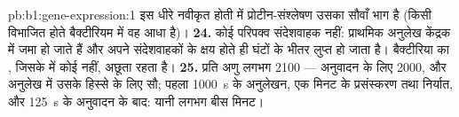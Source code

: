 \begin{solution}{pb:b1:gene-expression:1}
इस धीरे नवीकृत होती  में प्रोटीन-संश्लेषण उसका सौवाँ भाग है (किसी
विभाजित होते बैक्टीरियम में वह आधा है)।
\textbf{24.} कोई परिपक्व संदेशवाहक नहीं: प्राथमिक अनुलेख केंद्रक में
जमा हो जाते हैं और  अपने संदेशवाहकों के क्षय होते ही घंटों के
भीतर लुप्त हो जाता है। बैक्टीरिया का , जिसके  में कोई 
नहीं, अछूता रहता है।
\textbf{25.} प्रति अणु लगभग 2100  --- अनुवादन के लिए 2000, और
अनुलेख में उसके हिस्से के लिए सौ; पहला  \qty{1000}{s} के अनुलेखन,
एक मिनट के प्रसंस्करण तथा निर्यात, और \qty{125}{s} के अनुवादन के बाद:
यानी लगभग बीस मिनट।
\end{solution}
